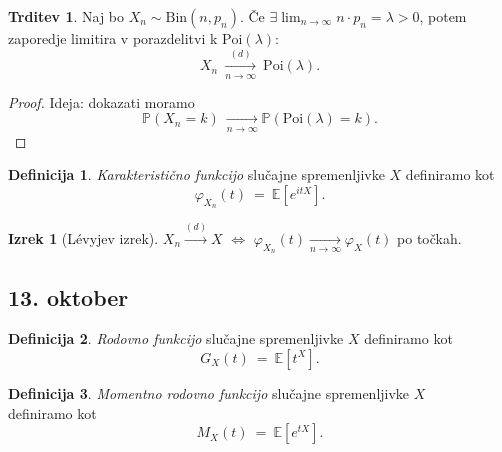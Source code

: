 \documentclass[11pt]{article}
\renewcommand{\P}{\mathbb{P}}
\newcommand{\E}{\mathbb{E}}
\theoremstyle{definition}
\newtheorem{definicija}{Definicija}[section]
\theoremstyle{definition}
\newtheorem{trditev}{Trditev}[section]
\theoremstyle{definition}
\newtheorem{izrek}{Izrek}[section]
\theoremstyle{definition}
\begin{document}
\begin{trditev}

Naj bo $X_n \sim \text{Bin}(n,p_n)$. Če $\exists \lim_{n \rightarrow \infty} n \cdot p_n = \lambda > 0$, potem zaporedje limitira v porazdelitvi k $\text{Poi}(\lambda)$:
$$X_n ~\xrightarrow[n \rightarrow \infty]{(d)}~ \text{Poi}(\lambda).$$

\begin{proof}
Ideja: dokazati moramo 
$$\P(X_n = k) ~\xrightarrow[n \rightarrow \infty]~ \P(\text{Poi}(\lambda) = k).$$
\end{proof}

\end{trditev}
\vspace{0.5cm}

\begin{definicija}

\textit{Karakteristično funkcijo} slučajne spremenljivke $X$ definiramo kot
$$\varphi_{X_n}(t) ~=~ \E[e^{itX}].$$

\end{definicija}
\vspace{0.5cm}

\begin{izrek}[L\'evyjev izrek]

$X_n \xrightarrow{(d)} X$ $\iff$ $\varphi_{X_n}(t) \xrightarrow[n \rightarrow \infty]~ \varphi_X(t)$ po točkah.

\end{izrek}
\vspace{0.5cm}


\subsection*{13. oktober}
\vspace{0.5cm}

\begin{definicija}

\textit{Rodovno funkcijo} slučajne spremenljivke $X$ definiramo kot
$$G_X(t) ~=~ \E[t^X].$$

\end{definicija}
\vspace{0.5cm}

\begin{definicija}

\textit{Momentno rodovno funkcijo} slučajne spremenljivke $X$ \\definiramo kot
$$M_X(t) ~=~ \E[e^{tX}].$$

\end{definicija}
\vspace{0.5cm}
\end{document}
